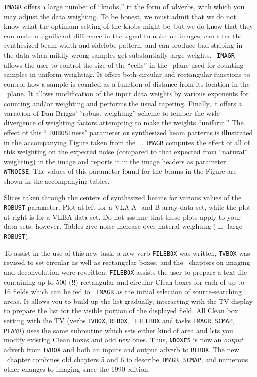 {\tt IMAGR} offers a large number of ``knobs,'' in the form of
adverbs, with which you may adjust the data weighting.  To be honest,
we must admit that we do not know what the optimum setting of the
knobs might be, but we do know that they can make a significant
difference in the signal-to-noise on images, can alter the synthesized
beam width and sidelobe pattern, and can produce bad striping in the
data when mildly wrong samples get substantially large weights.  {\tt
IMAGR} allows the user to control the size of the ``cells'' in the
\uv\ plane used for counting samples in uniform weighting.  It offers
both circular and rectangular functions to control how a sample is
counted as a function of distance from its location in the \uv\
plane. It allows modification of the input data weights by various
exponents for counting and/or weighting and performs the usual
tapering.  Finally, it offers a variation of Dan Briggs' ``robust
weighting'' scheme to temper the wide divergence of weighting factors
attempting to make the weights ``uniform.''  The effect of this ``{\tt
ROBUST}ness'' parameter on synthesized beam patterns is illustrated in
the accompanying Figure taken from the \AIPS\ \Cookbook.  {\tt IMAGR}
computes the effect of all of this weighting on the expected noise
(compared to that expected from ``natural'' weighting) in the image
and reports it in the image headers as parameter \hbox{{\tt WTNOISE}}.
The values of this parameter found for the beams in the Figure are
shown in the accompanying tables.

\vfill
\centerline{\hss
      }

{\small
\noindent Slices taken through the centers of synthesized beams for
various values of the {\tt ROBUST} parameter.  Plot at left for a VLA
A- and B-array data set, while the plot at right is for a VLBA data
set.  Do not assume that these plots apply to your data sets,
however.  Tables give noise increase over natural weighting ($\equiv$
large {\tt ROBUST}).}
\eject

To assist in the use of this new task, a new verb {\tt FILEBOX} was
written, {\tt TVBOX} was revised to set circular as well as
rectangular boxes, and the \Cookbook\ chapters on imaging and
deconvolution were rewritten.  {\tt FILEBOX} assists the user to
prepare a text file containing up to 500 (!!) rectangular and circular
Clean boxes for each of up to 16 fields which can be fed to {\tt
IMAGR} as the initial selection of source-searching areas.  It allows
you to build up the list gradually, interacting with the TV display to
prepare the list for the visible portion of the displayed field.  All
Clean box setting with the TV (verbs {\tt TVBOX}, {\tt REBOX}, {\tt
FILEBOX} and tasks {\tt IMAGR}, {\tt SCMAP}, {\tt PLAYR}) uses the
same subroutine which sets either kind of area and lets you modify
existing Clean boxes and add new ones.  Thus, {\tt NBOXES} is now an
{\it output} adverb from {\tt TVBOX} and both an inputs and output
adverb to \hbox{{\tt REBOX}}.  The new \Cookbook\ chapter combines old
chapters 5 and 6 to describe {\tt IMAGR}, {\tt SCMAP}, and numerous
other changes to imaging since the 1990 edition.

